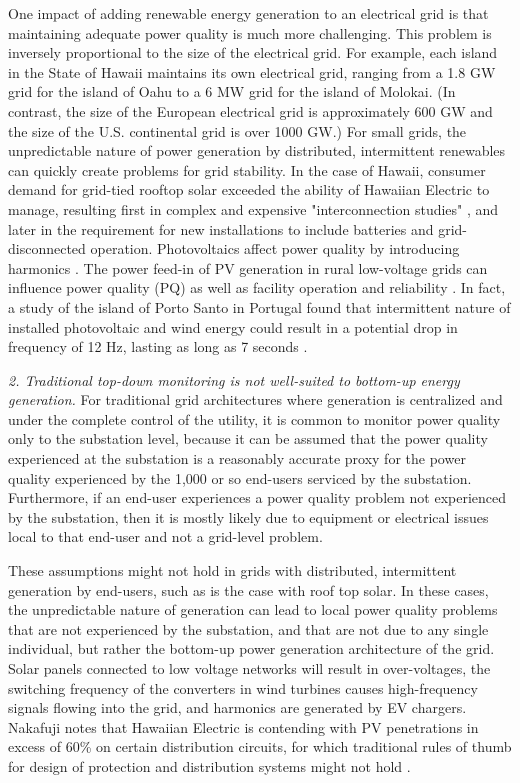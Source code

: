 One impact of adding renewable energy generation to an electrical grid is that maintaining adequate power quality is much more challenging. This problem is inversely proportional to the size of the electrical grid. For example, each island in the State of Hawaii maintains its own electrical grid, ranging from a 1.8 GW grid for the island of Oahu to a 6 MW grid for the island of Molokai.  (In contrast, the size of the European electrical grid is approximately 600 GW and the size of the U.S. continental grid is over 1000 GW.) For small grids, the unpredictable nature of power generation by distributed, intermittent renewables can quickly create problems for grid stability. In the case of Hawaii, consumer demand for grid-tied rooftop solar exceeded the ability of Hawaiian Electric to manage, resulting first in complex and expensive "interconnection studies" \cite{trabish_solar_2014,anastasi_energy_2009}, and later in the requirement for new installations to include batteries and grid-disconnected operation. Photovoltaics affect power quality by introducing harmonics \cite{anurangi_effects_2017}. The power feed-in of PV generation in rural low-voltage grids can influence power quality (PQ) as well as facility operation and reliability \cite{rita_pinto_impact_2016}. In fact, a study of the island of Porto Santo in Portugal found that intermittent nature of installed photovoltaic and wind energy could result in a potential drop in frequency of 12 Hz, lasting as long as 7 seconds \cite{delgado_solutions_2011}.

{\em 2. Traditional top-down monitoring is not well-suited to bottom-up energy generation.} For traditional grid architectures where generation is centralized and under the complete control of the utility, it is common to monitor power quality only to the substation level, because it can be assumed that the power quality experienced at the substation is a reasonably accurate proxy for the power quality experienced by the 1,000 or so end-users serviced by the substation. Furthermore, if an end-user experiences a power quality problem not experienced by the substation, then it is mostly likely due to equipment or electrical issues local to that end-user and not a grid-level problem.

These assumptions might not hold in grids with distributed, intermittent generation by end-users, such as is the case with roof top solar. In these cases, the unpredictable nature of generation can lead to local power quality problems that are not experienced by the substation, and that are not due to any single individual, but rather the bottom-up power generation architecture of the grid. Solar panels connected to low voltage networks will result in over-voltages, the switching frequency of the converters in wind turbines causes high-frequency signals flowing into the grid, and harmonics are generated by EV chargers. \cite{zavoda_power_2018}
 Nakafuji notes that Hawaiian Electric is contending with PV penetrations in excess of 60\% on certain distribution circuits, for which traditional rules of thumb for design of protection and distribution systems might not hold \cite{nakafuji_back--basics_2011}.

